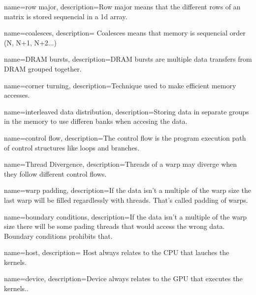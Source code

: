 



{
	name={row major},
	description={Row major means that the different rows of an
		matrix is stored sequencial in a 1d array.}
}

{
	name={coalesces},
	description={ Coalesces means that memory is sequencial order (N, N+1, N+2...)}
}

{
	name={DRAM bursts},
	description={DRAM bursts are multiple data transfers from DRAM grouped together. }
}

{
	name={corner turning},
	description={Technique used to make efficient memory accesses. }
}

{
	name={interleaved data distribution},
	description={Storing data in separate groups in the memory to use differen banks when accesing the data. }
}

{
	name={control flow},
	description={The control flow is the program execution path of control structures like loops and branches. }
}

{
	name={Thread Divergence},
	description={Threads of a warp may diverge when they follow different control flows. }
}

{
	name={warp padding},
	description={If the data isn't a multiple of the warp size the last warp will be filled regardlessly with threads. That's called padding of warps. }
}

{
	name={boundary conditions},
	description={If the data isn't a multiple of the warp size there will be some pading threads that would access the wrong data. Boundary conditions prohibits that. }
}

{
	name={host},
	description={ Host always relates to the CPU that lauches the kernels. }
}

{
	name={device},
	description={Device always relates to the GPU that executes the kernels.. }
}



